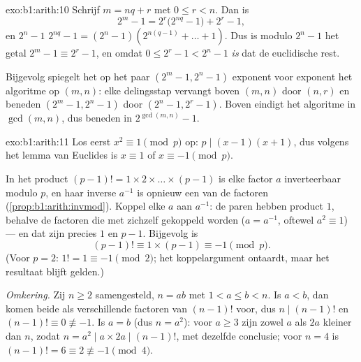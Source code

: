 \begin{solution}{exo:b1:arith:10}
Schrijf $m = nq + r$ met $0 \leq r < n$. Dan is
\[
2^m - 1 = 2^r\bigl(2^{nq} - 1\bigr) + 2^r - 1,
\]
en $2^n - 1$  $2^{nq} - 1 = (2^n - 1)(2^{n(q-1)} + \dots + 1)$. Dus
is modulo $2^n - 1$ het getal $2^m - 1 \equiv 2^r - 1$, en omdat $0 \leq
2^r - 1 < 2^n - 1$ \emph{is} dat de euclidische rest.

Bijgevolg spiegelt het  op het paar $(2^m - 1, 2^n
- 1)$ exponent voor exponent het algoritme op $(m, n)$: elke delingsstap
vervangt boven $(m, n)$ door $(n, r)$ en beneden $(2^m - 1, 2^n - 1)$
door $(2^n - 1, 2^r - 1)$. Boven eindigt het algoritme in $\gcd(m,n)$,
dus beneden in $2^{\gcd(m,n)} - 1$.
\end{solution}

\begin{solution}{exo:b1:arith:11}
Los eerst $x^2 \equiv 1 \pmod p$ op: $p \mid (x-1)(x+1)$, dus volgens het
lemma van Euclides is $x \equiv 1$ of $x \equiv -1 \pmod p$.

In het product $(p-1)! = 1 \times 2 \times \dots \times (p-1)$ is elke
factor $a$ inverteerbaar modulo $p$, en haar inverse $a^{-1}$ is opnieuw
een van de factoren (\cref{prop:b1:arith:invmod}). Koppel elke $a$ aan
$a^{-1}$: de paren hebben product $1$, behalve de factoren die met
zichzelf gekoppeld worden ($a = a^{-1}$, oftewel $a^2 \equiv 1$) --- en
dat zijn precies $1$ en $p - 1$. Bijgevolg is
\[
(p-1)! \equiv 1 \times (p - 1) \equiv -1 \pmod p .
\]
(Voor $p = 2$: $1! = 1 \equiv -1 \pmod 2$; het koppelargument ontaardt,
maar het resultaat blijft gelden.)

\emph{Omkering.} Zij $n \geq 2$ samengesteld, $n = ab$ met $1 < a \leq b
< n$. Is $a < b$, dan komen beide als verschillende factoren van $(n-1)!$
voor, dus $n \mid (n-1)!$ en $(n-1)! \equiv 0 \not\equiv -1$. Is $a = b$
(dus $n = a^2$): voor $a \geq 3$ zijn zowel $a$ als $2a$ kleiner dan $n$,
zodat $n = a^2 \mid a \times 2a \mid (n-1)!$, met dezelfde conclusie;
voor $n = 4$ is $(n-1)! = 6 \equiv 2 \not\equiv -1 \pmod 4$.
\end{solution}

